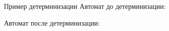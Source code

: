 \begin{frame}{Пример детерминизации}
    Автомат до детерминизации:


    Автомат после детерминизации:

\end{frame}
